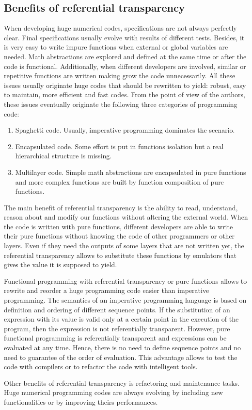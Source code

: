 \subsection{Benefits of referential transparency} 
When developing huge numerical codes, specifications are not always perfectly clear. 
Final specifications usually evolve with results of different tests. Besides, it is very easy to 
write impure functions when external or global variables are needed.
Math abstractions are explored and defined at the same time or after the code is functional. 
Additionally,  when different developers are involved,  
similar or repetitive functions are written making grow the code unnecessarily. 
All these issues usually originate  huge codes that should be 
rewritten to yield: robust, easy to maintain, more efficient and fast codes. 
From the point of view of the authors, these issues eventually originate 
the following three categories of programming code: 
\begin{enumerate}
\item Spaghetti code. Usually, imperative programming dominates the scenario. 
\item Encapsulated code. Some effort is put in functions isolation but a real hierarchical 
 structure is missing. 
\item Multilayer code. Simple math abstractions are encapsulated in pure functions and 
more complex functions are built by function composition of pure functions. 
\end{enumerate}
The main benefit of referential transparency  is
the ability to read, understand, reason about and modify our 
functions without altering the external world. 
When the code is written with pure functions, different developers are able to write 
their pure functions without knowing the code of other programmers or other layers. 
Even if they need the outputs of some layers that are not written yet, the referential
transparency allows to substitute these functions by emulators that gives
the value it is supposed to yield. 


Functional programming  with referential transparency or pure functions allows to rewrite and reorder 
a huge programming code easier than imperative programming. 
The semantics of an imperative programming language is based on definition 
and ordering of different sequence points.
If the substitution of an expression with its value is valid only at a certain point 
in the execution of the program, then the expression is 
not referentially transparent. 
However, pure functional programming 
is referentially transparent and expressions can be evaluated at any time. 
Hence, there is no need to define sequence points and no need 
to guarantee of the order of evaluation. 
This advantage allows to test the code with compilers or to refactor
the code with intelligent tools. 

Other benefits of referential transparency is refactoring and maintenance tasks. 
Huge numerical programming codes are always evolving by including new functionalities 
or by improving theirs performances. 

  
  
  